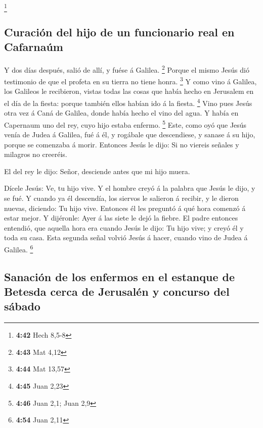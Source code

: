\footnote{\textbf{4:42} Hech 8,5-8}

\hypertarget{curaciuxf3n-del-hijo-de-un-funcionario-real-en-cafarnauxfam}{%
\subsection{Curación del hijo de un funcionario real en
Cafarnaúm}\label{curaciuxf3n-del-hijo-de-un-funcionario-real-en-cafarnauxfam}}

 Y dos días después, salió de allí, y fuése á Galilea.
\footnote{\textbf{4:43} Mat 4,12}  Porque el mismo Jesús
dió testimonio de que el profeta en su tierra no tiene honra.
\footnote{\textbf{4:44} Mat 13,57}  Y como vino á Galilea,
los Galileos le recibieron, vistas todas las cosas que había hecho en
Jerusalem en el día de la fiesta: porque también ellos habían ido á la
fiesta. \footnote{\textbf{4:45} Juan 2,23}  Vino pues Jesús
otra vez á Caná de Galilea, donde había hecho el vino del agua. Y había
en Capernaum uno del rey, cuyo hijo estaba enfermo. \footnote{\textbf{4:46}
  Juan 2,1; Juan 2,9}  Este, como oyó que Jesús venía de
Judea á Galilea, fué á él, y rogábale que descendiese, y sanase á su
hijo, porque se comenzaba á morir.  Entonces Jesús le dijo:
Si no viereis señales y milagros no creeréis.

 El del rey le dijo: Señor, desciende antes que mi hijo
muera.

 Dícele Jesús: Ve, tu hijo vive. Y el hombre creyó á la
palabra que Jesús le dijo, y se fué.  Y cuando ya él
descendía, los siervos le salieron á recibir, y le dieron nuevas,
diciendo: Tu hijo vive.  Entonces él les preguntó á qué
hora comenzó á estar mejor. Y dijéronle: Ayer á las siete le dejó la
fiebre.  El padre entonces entendió, que aquella hora era
cuando Jesús le dijo: Tu hijo vive; y creyó él y toda su casa.
 Esta segunda señal volvió Jesús á hacer, cuando vino de
Judea á Galilea. \footnote{\textbf{4:54} Juan 2,11}

\hypertarget{sanaciuxf3n-de-los-enfermos-en-el-estanque-de-betesda-cerca-de-jerusaluxe9n-y-concurso-del-suxe1bado}{%
\subsection{Sanación de los enfermos en el estanque de Betesda cerca de
Jerusalén y concurso del
sábado}\label{sanaciuxf3n-de-los-enfermos-en-el-estanque-de-betesda-cerca-de-jerusaluxe9n-y-concurso-del-suxe1bado}}

